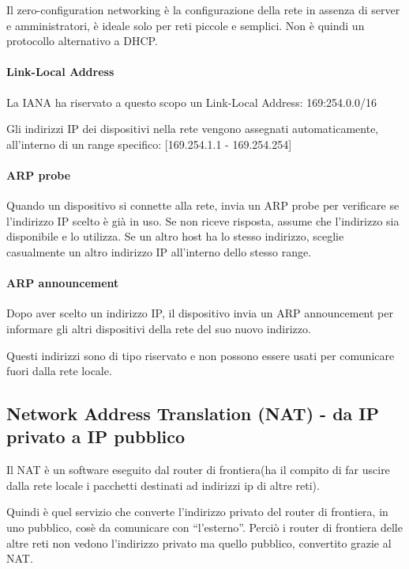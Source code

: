 Il zero-configuration networking è la configurazione della rete in assenza di server e amministratori, è ideale solo per reti piccole e semplici. Non è quindi un protocollo alternativo a DHCP.

\paragraph{Link-Local Address}
La IANA ha riservato a questo scopo un Link-Local Address: 169:254.0.0/16 

Gli indirizzi IP dei dispositivi nella rete vengono assegnati automaticamente, all'interno di un range specifico: [169.254.1.1 - 169.254.254]

\paragraph{ARP probe}
Quando un dispositivo si connette alla rete, invia un ARP probe per verificare se l'indirizzo IP scelto è già in uso. Se non riceve risposta, assume che l'indirizzo sia disponibile e lo utilizza. 
Se un altro host ha lo stesso indirizzo, sceglie casualmente un altro indirizzo IP all'interno dello stesso range.

\paragraph{ARP announcement}
Dopo aver scelto un indirizzo IP, il dispositivo invia un ARP announcement per informare gli altri dispositivi della rete del suo nuovo indirizzo. 

Questi indirizzi sono di tipo riservato e non possono essere usati per comunicare fuori dalla rete locale.



\subsection{Network Address Translation (NAT) - da IP privato a IP pubblico}


Il NAT è un software eseguito dal router di frontiera(ha il compito di far uscire dalla rete locale i pacchetti destinati ad indirizzi ip di altre reti).

Quindi è quel servizio che converte l'indirizzo privato del router di frontiera, in uno pubblico, cosè da comunicare con “l'esterno”. 
Perciò i router di frontiera delle altre reti non vedono l'indirizzo privato ma quello pubblico, convertito grazie al NAT.

